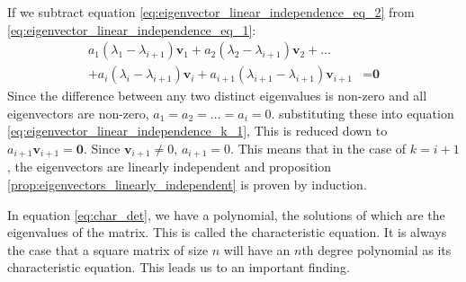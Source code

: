 \documentclass[a4paper,12pt]{article}
\newcommand{\vectr}[1]{\textbf{#1}}
\begin{document}
	If we subtract equation \ref{eq:eigenvector_linear_independence_eq_2} from \ref{eq:eigenvector_linear_independence_eq_1}:
	\begin{align}
		a_1 (\lambda_1 - \lambda_{i + 1}) \vectr{v}_1 + a_2 (\lambda_2 - \lambda_{i + 1}) \vectr{v}_2 + \ldots \nonumber \\+ a_i (\lambda_i - \lambda_{i + 1}) \vectr{v}_i + a_{i + 1} (\lambda_{i + 1} - \lambda_{i + 1}) \vectr{v}_{i + 1} &= \vectr{0} 
	\end{align}
	Since the difference between any two distinct eigenvalues is non-zero and all eigenvectors are non-zero, $ a_1 = a_2 = \ldots = a_i = 0 $. substituting these into equation \ref{eq:eigenvector_linear_independence_k_1}, This is reduced down to $ a_{i + 1}\vectr{v}_{i + 1} = \vectr{0}$. Since $ \vectr{v}_{i + 1} \ne 0 $,  $ a_{i + 1} = 0 $. This means that in the case of $ k = i + 1 $, the eigenvectors are linearly independent and proposition \ref{prop:eigenvectors_linearly_independent} is proven by induction.
	
	In equation \ref{eq:char_det}, we have a polynomial, the solutions of which are the eigenvalues of the matrix. This is called the characteristic equation. It is always the case that a square matrix of size $ n $ will have an $ n $th degree polynomial as its characteristic equation. This leads us to an important finding.
	
\end{document}
